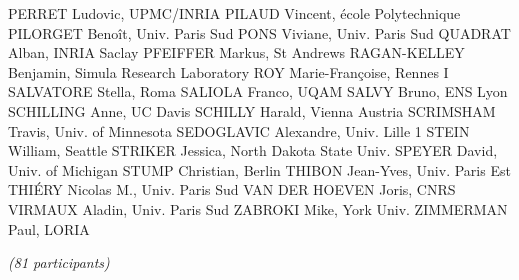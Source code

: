 \documentclass[12pt]{amsart}
\begin{document}
PERRET Ludovic, UPMC/INRIA
PILAUD Vincent, école Polytechnique
PILORGET Benoît, Univ. Paris Sud
PONS Viviane, Univ. Paris Sud
QUADRAT Alban, INRIA Saclay
PFEIFFER Markus, St Andrews
RAGAN-KELLEY Benjamin, Simula Research Laboratory
ROY Marie-Françoise, Rennes I
SALVATORE Stella, Roma
SALIOLA Franco, UQAM
SALVY Bruno, ENS Lyon
SCHILLING Anne, UC Davis
SCHILLY Harald, Vienna Austria
SCRIMSHAM Travis, Univ. of Minnesota
SEDOGLAVIC Alexandre, Univ. Lille 1
STEIN William, Seattle
STRIKER Jessica, North Dakota State Univ.
SPEYER David, Univ. of Michigan
STUMP Christian, Berlin
THIBON Jean-Yves, Univ. Paris Est
THIÉRY Nicolas M., Univ. Paris Sud
VAN DER HOEVEN Joris, CNRS
VIRMAUX Aladin, Univ. Paris Sud
ZABROKI Mike, York Univ.
ZIMMERMAN Paul, LORIA

\medskip
\emph{(81 participants)}
\end{document}
